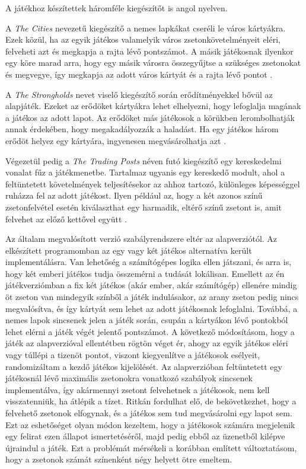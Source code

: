 
A játékhoz készítettek háromféle kiegészítőt is angol nyelven.

A \textit{The Cities} nevezetű kiegészítő a nemes lapkákat cseréli le város kártyákra. Ezek közül, ha az egyik játékos valamelyik város zsetonkövetelményeit eléri, felveheti azt és megkapja a rajta lévő pontszámot. A másik játékosnak ilyenkor egy köre marad arra, hogy egy másik városra összegyűjtse a szükséges zsetonokat és megvegye, így megkapja az adott város kártyát és a rajta lévő pontot \cite{cities}.

A \textit{The Strongholds} nevet viselő kiegészítő során erődítményekkel bővül az alapjáték. Ezeket az erődöket kártyákra lehet elhelyezni, hogy lefoglalja magának a játékos az adott lapot. Az erődöket más játékosok a körükben lerombolhatják annak érdekében, hogy megakadályozzák a haladást. Ha egy játékos három erődöt helyez egy kártyára, ingyenesen megvásárolhatja azt \cite{strongholds}.

Végezetül pedig a \textit{The Trading Posts} néven futó kiegészítő egy kereskedelmi vonalat fűz a játékmenetbe. Tartalmaz ugyanis egy kereskedő modult, ahol a feltüntetett követelmények teljesítésekor az ahhoz tartozó, különleges képességgel ruházza fel az adott játékost. Ilyen például az, hogy a két azonos színű zsetonfelvétel esetén kiválaszthat egy harmadik, eltérő színű zsetont is, amit felvehet az előző kettővel együtt \cite{trading}.


Az általam megvalósított verzió szabályrendszere eltér az alapverziótól. Az elkészített programomban az egy vagy két játékos alternatíva került implementálásra. Van lehetőség a számítógépes logika ellen játszani, és arra is, hogy két emberi játékos tudja összemérni a tudását lokálisan. Emellett az én játékverziómban a fix két játékos (akár ember, akár számítógép) ellenére mindig öt zseton van mindegyik színből a játék indulásakor, az arany zseton pedig nincs megvalósítva, és így kártyát sem lehet az adott játékosnak lefoglalni. Továbbá, a nemes lapok sincsenek jelen a játék során, csupán a kártyákon lévő pontokból lehet elérni a játék végét jelentő pontszámot. A következő módosításom, hogy a játék az alapverzióval ellentétben rögtön véget ér, ahogy az egyik játékos eléri vagy túllépi a tizenöt pontot, viszont kiegyenlítve a játékosok esélyeit, randomizáltam a kezdő játékos kijelölését. Az alapverzióban feltüntetett egy játékosnál lévő maximális zsetonokra vonatkozó szabályok sincsenek implementálva, így akármennyi zsetont felvehetnek a játékosok, nem kell visszatenniük, ha átlépik a tízet. Ritkán fordulhat elő, de bekövetkezhet, hogy a felvehető zsetonok elfogynak, és a játékos sem tud megvásárolni egy lapot sem. Ezt az eshetőséget olyan módon kezeltem, hogy a játékosok számára megjelenik egy felirat ezen állapot ismertetéséről, majd pedig ebből az üzenetből kilépve újraindul a játék. Ezt a problémát mérsékeli a korábban említett változtatásom, hogy a zsetonok számát színenként négy helyett ötre emeltem. 

